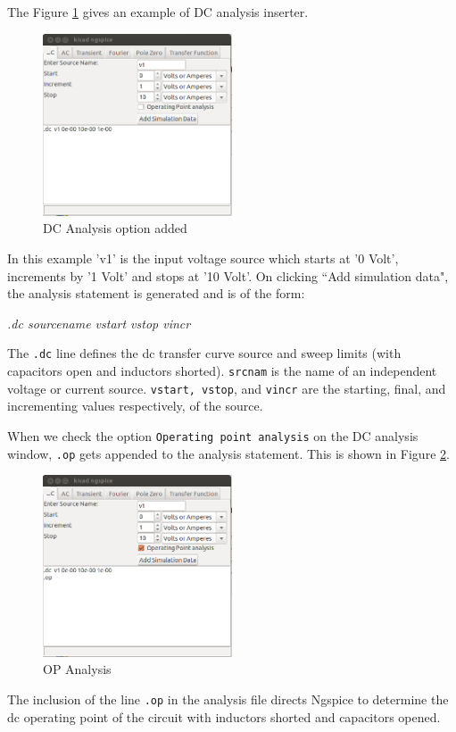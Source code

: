 The Figure \ref{2} gives an example of DC analysis inserter.
\begin{figure}[t]
\centering
\includegraphics[width=0.5\textwidth]{figures/2}
\caption{DC Analysis option added}
\label{2}
\end{figure}
In this example 'v1' is the input voltage source which starts at '0 Volt', increments by '1 Volt' and stops at '10 Volt'. On clicking ``Add simulation data", the analysis statement is generated and is of the form:

\textit{.dc sourcename vstart vstop vincr}

The {\tt .dc} line defines the dc transfer curve source and sweep limits (with capacitors open and inductors shorted). {\tt srcnam} is the name of an independent voltage or current source. {\tt vstart, vstop}, and {\tt vincr} are the starting, final, and incrementing values respectively, of the source.

When we check the option {\tt Operating point analysis} on the DC analysis window, {\tt .op} gets appended to the analysis statement. This is shown in Figure \ref{3}.
\begin{figure}[t]
\centering
\includegraphics[width=0.5\textwidth]{figures/3}
\caption{OP Analysis}
\label{3}
\end{figure}
The inclusion of the line {\tt .op} in the analysis file directs Ngspice to determine the dc operating point of the circuit with inductors shorted and capacitors opened. 
